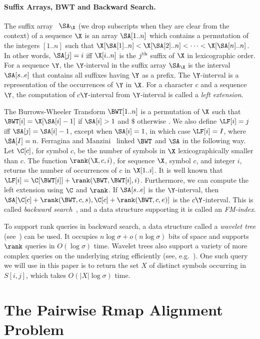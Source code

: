 \documentclass[doctor]{thesis}
\begin{document}
\paragraph{Suffix Arrays, BWT and Backward Search.}
The suffix array~\cite{mm1993} $\SA_{\X}$ (we drop subscripts when
they are clear
from the context) of a sequence $\X$
is an array $\SA[1..n]$ which
contains a permutation of the integers $[1..n]$ such that $\X[\SA[1]..n]
< \X[\SA[2]..n] < \cdots < \X[\SA[n]..n]$.  In other words, $\SA[j] =
i$ iff $\X[i..n]$ is the $j^{\mbox{{\scriptsize th}}}$ suffix of $\X$
in lexicographic order. For a sequence $\Y$, the $\Y$-interval in the suffix array $\SA_{\X}$ is
the interval $\SA[s..e]$ that contains all suffixes having $\Y$ as a
prefix. The $\Y$-interval is a representation of the occurrences of
$\Y$ in $\X$. For a character $c$ and a sequence $\Y$, the computation
of $c\Y$-interval from $\Y$-interval is called a \emph{left extension}.

The Burrows-Wheeler Transform $\BWT[1..n]$ is a
permutation of $\X$ such that $\BWT[i] = \X[\SA[i]-1]$ if $\SA[i]>1$
and $\$$ otherwise \cite{bw1994}. We also define $\LF[i] = j$ iff $\SA[j] =
\SA[i]-1$, except when $\SA[i] = 1$, in which case $\LF[i] = I$,
where $\SA[I] = n$.  Ferragina and Manzini~\cite{fm2005} linked $\BWT$ and $\SA$ in the
following way.  
Let $\C[c]$, for symbol $c$, be the number of symbols
in $\X$ lexicographically smaller than $c$.  The function
$\rank(\X,c,i)$, for sequence $\X$, symbol $c$, and integer $i$, returns
the number of occurrences of $c$ in $\X[1..i]$.  It is well known that
$\LF[i] = \C[\BWT[i]] + \rank(\BWT,\BWT[i],i)$.  Furthermore, we can
compute the left extension using $\C$ and $\rank$.  If $\SA[s..e]$ is
the $\Y$-interval,
then
$\SA[\C[c]+\rank(\BWT,c,s),\C[c]+\rank(\BWT,c,e)]$ is
the $c\Y$-interval.
This is called \emph{backward search}~\cite{fm2005}, and a data
structure supporting it is called an {\em FM-index}.

To support rank queries in backward search, a data structure called a {\em wavelet tree} (see~\cite{GNPtcs11}) 
can be used. It occupies $n\log\sigma + o(n\log\sigma)$
bits of space and supports $\rank$ queries in $O(\log\sigma)$ time.
Wavelet trees also support a variety of more complex queries on the underlying string  efficiently (see, e.g.~\cite{GNPtcs11}). 
One such query we will use in this paper 
is to return the set $X$ of 
distinct symbols occurring in $S[i,j]$, which takes
$O(|X|\log\sigma)$ time.

 
\makeatletter{}\section{The Pairwise Rmap Alignment Problem}
\end{document}
